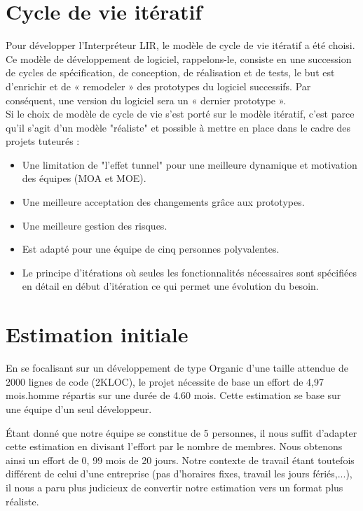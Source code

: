 \section{Cycle de vie itératif}
Pour développer l’Interpréteur LIR, le modèle de cycle de vie itératif a été
choisi. Ce modèle de développement de logiciel, rappelons-le, consiste en une
succession de cycles de spécification, de conception, de réalisation et de
tests, le but est d’enrichir et de « remodeler » des prototypes du logiciel
successifs. Par conséquent, une version du logiciel sera un « dernier
prototype ».
\\Si le choix de modèle de cycle de vie s'est porté sur le modèle itératif,
c'est parce qu'il s'agit d'un modèle "réaliste" et possible à mettre en place
dans le cadre des projets tuteurés :

\begin{itemize}
    \item Une limitation de "l'effet tunnel" pour une meilleure dynamique et motivation des équipes (MOA et MOE).
    \item Une meilleure acceptation des changements grâce aux prototypes.
    \item Une meilleure gestion des risques.
    \item Est adapté pour une équipe de cinq personnes polyvalentes.
    \item Le principe d'itérations où seules les fonctionnalités nécessaires sont spécifiées en détail en début d'itération ce qui permet une évolution du besoin.
\end{itemize}

\section{Estimation initiale}
En se focalisant sur un développement de type Organic d'une taille attendue
de 2000 lignes de code (2KLOC), le projet nécessite de base un effort de 4,97
mois.homme répartis sur une durée de 4.60 mois. Cette estimation se base sur
une équipe d'un seul développeur.

\'{E}tant donné que notre équipe se constitue de 5 personnes, il nous suffit
d'adapter cette estimation en divisant l'effort par le nombre de membres. Nous
obtenons ainsi un effort de 0, 99 mois de 20 jours. Notre contexte de travail
étant toutefois différent de celui d'une entreprise (pas d'horaires fixes,
travail les jours fériés,...), il nous a paru plus judicieux de convertir
notre estimation vers un format plus réaliste.

